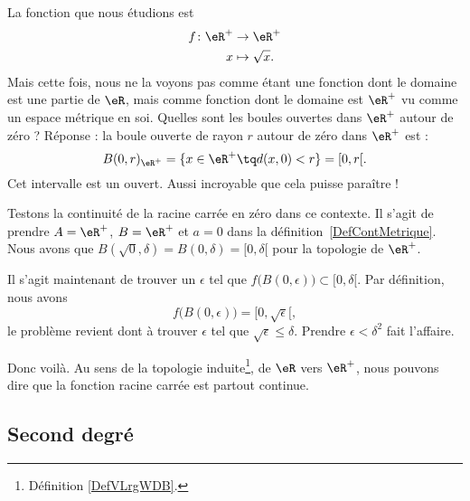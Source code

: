 La fonction que nous étudions est
\begin{equation}
	\begin{aligned}
		f \colon \eR^+ & \to \eR^+         \\
		x              & \mapsto \sqrt{x}.
	\end{aligned}
\end{equation}
Mais cette fois, nous ne la voyons pas comme étant une fonction dont le domaine est une partie de \( \eR\), mais comme fonction dont le domaine est \( \eR^+\) vu comme un espace métrique en soi. Quelles sont les boules ouvertes dans \( \eR^+\) autour de zéro ? Réponse : la boule ouverte de rayon \( r\) autour de zéro dans \( \eR^+\) est :
\[
	B(0,r)_{\eR^+}=\{ x\in\eR^+\tq d(x,0)<r \}=[0,r[.
\]
Cet intervalle est un ouvert. Aussi incroyable que cela puisse paraître !

Testons la continuité de la racine carrée en zéro dans ce contexte. Il s'agit de prendre \( A=\eR^+\), \( B=\eR^+\) et \( a=0\) dans la définition~\ref{DefContMetrique}. Nous avons que \( B(\sqrt{0},\delta)=B(0,\delta)=[0,\delta[\) pour la topologie de \( \eR^+\).

Il s'agit maintenant de trouver un \( \epsilon\) tel que \( f\big( B(0,\epsilon) \big)\subset [0,\delta[\). Par définition, nous avons
\[
	f\big( B(0,\epsilon) \big)=[0,\sqrt{\epsilon}[,
\]
le problème revient dont à trouver \( \epsilon\) tel que \( \sqrt{\epsilon}\leq\delta\). Prendre \( \epsilon<\delta^2\) fait l'affaire.

Donc voilà. Au sens de la topologie induite\footnote{Définition \ref{DefVLrgWDB}.}, de \( \eR\) vers \( \eR^+\), nous pouvons dire que la fonction racine carrée est partout continue.

\subsection{Second degré}

